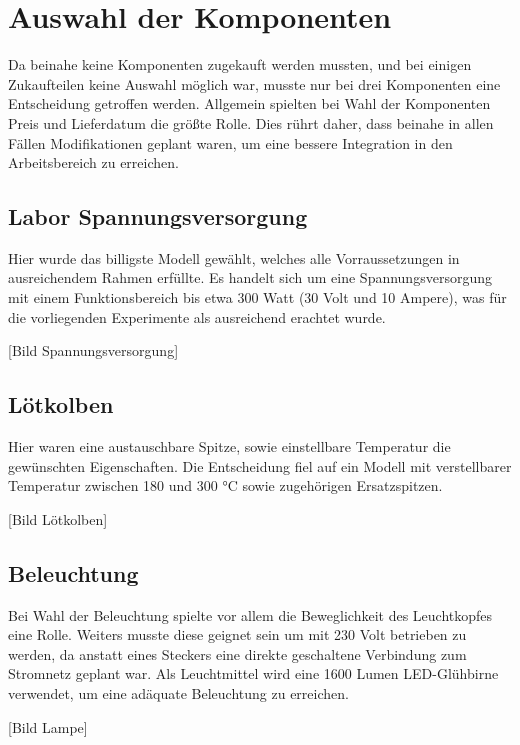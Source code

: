 \section{Auswahl der Komponenten}

Da beinahe keine Komponenten zugekauft werden mussten, und bei einigen Zukaufteilen keine Auswahl möglich war, musste nur bei drei Komponenten eine Entscheidung getroffen werden.
Allgemein spielten bei Wahl der Komponenten Preis und Lieferdatum die größte Rolle.
Dies rührt daher, dass beinahe in allen Fällen Modifikationen geplant waren, um eine bessere Integration in den Arbeitsbereich zu erreichen.

\subsection{Labor Spannungsversorgung}

Hier wurde das billigste Modell gewählt, welches alle Vorraussetzungen in ausreichendem Rahmen erfüllte.
Es handelt sich um eine Spannungsversorgung mit einem Funktionsbereich bis etwa 300 Watt (30 Volt und 10 Ampere), was für die vorliegenden Experimente als ausreichend erachtet wurde.

[Bild Spannungsversorgung]

\subsection{Lötkolben}

Hier waren eine austauschbare Spitze, sowie einstellbare Temperatur die gewünschten Eigenschaften.
Die Entscheidung fiel auf ein Modell mit verstellbarer Temperatur zwischen 180 und 300 °C sowie zugehörigen Ersatzspitzen.

[Bild Lötkolben]

\subsection{Beleuchtung}

Bei Wahl der Beleuchtung spielte vor allem die Beweglichkeit des Leuchtkopfes eine Rolle. 
Weiters musste diese geignet sein um mit 230 Volt betrieben zu werden, da anstatt eines Steckers eine direkte geschaltene Verbindung zum Stromnetz geplant war.
Als Leuchtmittel wird eine 1600 Lumen LED-Glühbirne verwendet, um eine adäquate Beleuchtung zu erreichen.

[Bild Lampe]